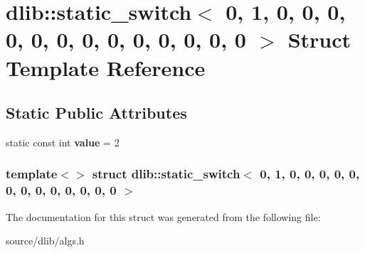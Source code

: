\hypertarget{structdlib_1_1static__switch_3_010_00_011_00_010_00_010_00_010_00_010_00_010_00_010_00_010_00_013c4ac657bc48737c62a5b545ecf666e2}{
\section{dlib::static\_\-switch$<$ 0, 1, 0, 0, 0, 0, 0, 0, 0, 0, 0, 0, 0, 0, 0 $>$ Struct Template Reference}
\label{structdlib_1_1static__switch_3_010_00_011_00_010_00_010_00_010_00_010_00_010_00_010_00_010_00_013c4ac657bc48737c62a5b545ecf666e2}
}
\subsection*{Static Public Attributes}
\begin{DoxyCompactItemize}
\item 
\hypertarget{structdlib_1_1static__switch_3_010_00_011_00_010_00_010_00_010_00_010_00_010_00_010_00_010_00_013c4ac657bc48737c62a5b545ecf666e2_a65d209ffff95f58e8b31fa66f53ab375}{
static const int {\bfseries value} = 2}
\label{structdlib_1_1static__switch_3_010_00_011_00_010_00_010_00_010_00_010_00_010_00_010_00_010_00_013c4ac657bc48737c62a5b545ecf666e2_a65d209ffff95f58e8b31fa66f53ab375}

\end{DoxyCompactItemize}
\subsubsection*{template$<$$>$ struct dlib::static\_\-switch$<$ 0, 1, 0, 0, 0, 0, 0, 0, 0, 0, 0, 0, 0, 0, 0 $>$}



The documentation for this struct was generated from the following file:\begin{DoxyCompactItemize}
\item 
source/dlib/algs.h\end{DoxyCompactItemize}
